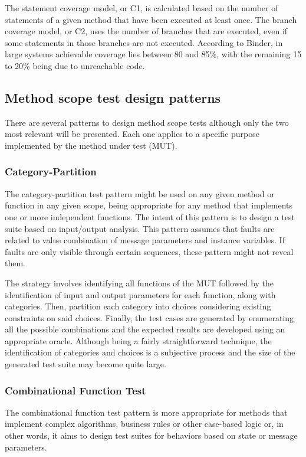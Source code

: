 \documentclass{sigchi}
\begin{document}
The statement coverage model, or C1, is calculated based on the number of statements of a given method that have been executed at least once. The branch coverage model, or C2, uses the number of branches that are executed, even if some statements in those branches are not executed.
According to Binder, in large systems achievable coverage lies between 80 and 85\%, with the remaining 15 to 20\% being due to unreachable code.

\subsection{Method scope test design patterns}
There are several patterns to design method scope tests although only the two most relevant will be presented. Each one applies to a specific purpose implemented by the method under test (MUT).
\subsubsection{Category-Partition}
The category-partition test pattern might be used on any given method or function in any given scope, being appropriate for any method that implements one or more independent functions. The intent of this pattern is to design a test suite based on input/output analysis.
This pattern assumes that faults are related to value combination of message parameters and instance variables. If faults are only visible through certain sequences, these pattern might not reveal them.

The strategy involves identifying all functions of the MUT followed by the identification of input and output parameters for each function, along with categories. Then, partition each category into choices considering existing constraints on said choices. Finally, the test cases are generated by enumerating all the possible combinations and the expected results are developed using an appropriate oracle.
Although being a fairly straightforward technique, the identification of categories and choices is a subjective process and the size of the generated test suite may become quite large.

\subsubsection{Combinational Function Test}
The combinational function test pattern is more appropriate for methods that implement complex algorithms, business rules or other case-based logic or, in other words, it aims to design test suites for behaviors based on state or message parameters.
\end{document}
